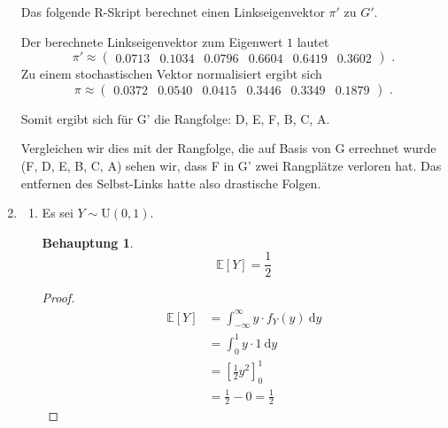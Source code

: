 \documentclass[a4paper]{scrartcl}
\newtheorem*{behaupt}{Behauptung}
\newcommand{\dif}{\ \mathrm{d}}
\newcommand{\e}{\mathbb{E}}
\def \blattnr {4}
\begin{document}
\begin{enumerate}[label=\bfseries \blattnr.\arabic*]
     \clearpage
     Das folgende R-Skript berechnet einen Linkseigenvektor $\pi'$ zu $G'$.
     
     Der berechnete Linkseigenvektor zum Eigenwert $1$ lautet
     \begin{equation*}
         \pi' \approx
         \begin{pmatrix}
             \num{0.0713} & \num{0.1034} & \num{0.0796} & \num{0.6604} &
             \num{0.6419} & \num{0.3602}
         \end{pmatrix}
         \text{ .}
     \end{equation*}
     Zu einem stochastischen Vektor normalisiert ergibt sich
     \begin{equation*}
         \pi \approx
         \begin{pmatrix}
             \num{0.0372} & \num{0.0540} & \num{0.0415} & \num{0.3446} &
             \num{0.3349} & \num{0.1879}
         \end{pmatrix}
         \text{ .}
     \end{equation*}
     
     Somit ergibt sich für G' die Rangfolge: D, E, F, B, C, A. 
     
     Vergleichen wir dies mit der Rangfolge, die auf Basis von G errechnet wurde (F, D, E, B, C, A)
     sehen wir, dass F in G' zwei Rangplätze verloren hat. Das entfernen des Selbst-Links hatte also 
     drastische Folgen.
    
    \item
        \begin{enumerate}
            \item
                Es sei $Y \sim \text{U}(0,1)$.
                \begin{behaupt}
                    \begin{equation*}
                        \e[Y] = \frac{1}{2}
                    \end{equation*}
                \end{behaupt}
                \begin{proof}
                    \begin{equation*}
                        \begin{split}
                            \e[Y]
                            &= \int_{-\infty}^\infty y \cdot f_Y(y) \dif y \\
                            &= \int_0^1 y \cdot 1 \dif y \\
                            &= \left[ \frac{1}{2}y^2 \right]_0^1 \\
                            &= \frac{1}{2} - 0 = \frac{1}{2}
                        \end{split}
                    \end{equation*}
                \end{proof}


\end{enumerate}
\end{enumerate}
\end{document}
